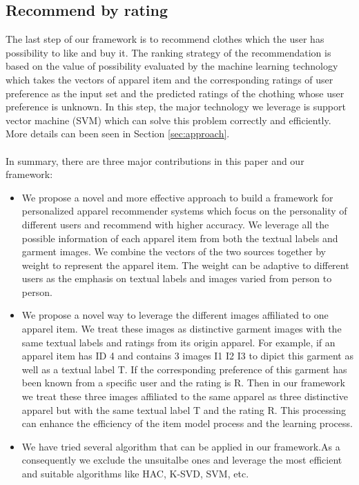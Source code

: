 \subsection{Recommend by rating}
The last step of our framework is to recommend clothes which the user has possibility to like and buy it. The ranking strategy of the recommendation is based on the value of possibility evaluated by the machine learning technology which takes the vectors of apparel item and the corresponding ratings of user preference as the input set and the predicted ratings of the chothing whose user preference is unknown. In this step, the major technology we leverage is support vector machine (SVM) which can solve this problem correctly and efficiently. More details can been seen in Section \ref{sec:approach}.\\
\\
In summary, there are three major contributions in this paper and our framework:
\begin{itemize}
	\item We propose a novel and more effective approach to build a framework for personalized apparel recommender systems which focus on the personality of different users and recommend with higher accuracy. We leverage all the possible information of each apparel item from both the textual labels and garment images. We combine the vectors of the two sources together by weight to represent the apparel item. The weight can be adaptive to different users as the emphasis on textual labels and images varied from person to person.
	\item We propose a novel way to leverage the different images affiliated to one apparel item. We treat these images as distinctive garment images with the same textual labels and ratings from its origin apparel. For example, if an apparel item has ID 4 and contains 3 images I1 I2 I3 to dipict this garment as well as a textual label T. If the corresponding preference of this garment has been known from a specific user and the rating is R. Then in our framework we treat these three images affiliated to the same apparel as three distinctive apparel but with the same textual label T and the rating R. This processing can enhance the efficiency of the item model process and the learning process.
	\item We have tried several algorithm that can be applied in our framework.As a consequently we exclude the unsuitalbe ones and leverage the most efficient and suitable algorithms like HAC, K-SVD, SVM, etc.
\end{itemize}
